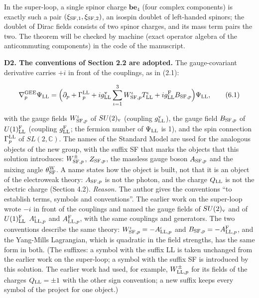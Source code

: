 \documentclass[
  10pt,
]{article}
\begin{document}
In the super-loop, a single spinor charge \(\mathbf b\mathbf e_4\) (four
complex components) is exactly such a pair
\((\xi_{{\rm SF},1},\xi_{{\rm SF},2})\), an isospin doublet of
left-handed spinors; the doublet of Dirac fields consists of two spinor
charges, and its mass term pairs the two. The theorem will be checked by
machine (exact operator algebra of the anticommuting components) in the
code of the manuscript.

\textbf{D2. The conventions of Section 2.2 are adopted.} The
gauge-covariant derivative carries \(+i\) in front of the couplings, as
in (2.1):

\[\nabla^{\rm GEE}_p\Psi_{\rm LL}=\Big(\partial_p+\Gamma^{\rm LL}_p+ig^{\rm v}_{\rm LL}\sum_{\iota=1}^3W^\iota_{{\rm SF},p}T^\iota_{\rm LL}+ig^{\rm F}_{\rm LL}B_{{\rm SF},p}\Big)\Psi_{\rm LL},\tag{6.1}\]

with the gauge fields \(W^\iota_{{\rm SF},p}\) of \(SU(2)_{\rm v}\)
(coupling \(g^{\rm v}_{\rm LL}\)), the gauge field \(B_{{\rm SF},p}\) of
\(U(1)^{\rm F}_{\rm LL}\) (coupling \(g^{\rm F}_{\rm LL}\); the fermion
number of \(\Psi_{\rm LL}\) is 1), and the spin connection
\(\Gamma^{\rm LL}_p\) of \(SL(2,\mathbb C)\). The names of the Standard
Model are used for the analogous objects of the new group, with the
suffix SF that marks the objects that this solution introduces:
\(W^\pm_{{\rm SF},p}\), \(Z_{{\rm SF},p}\), the massless gauge boson
\(A_{{\rm SF},p}\) and the mixing angle \(\theta^{\rm W}_{\rm SF}\). A
name states how the object is built, not that it is an object of the
electroweak theory: \(A_{{\rm SF},p}\) is not the photon, and the charge
\(Q_{\rm LL}\) is not the electric charge (Section 4.2). \emph{Reason.}
The author gives the conventions ``to establish terms, symbols and
conventions''. The earlier work on the super-loop wrote \(-i\) in front
of the couplings and named the gauge fields of \(SU(2)_{\rm v}\) and of
\(U(1)^{\rm F}_{\rm LL}\) \(A^\iota_{{\rm LL},p}\) and
\(A^{\rm F}_{{\rm LL},p}\), with the same couplings and generators. The
two conventions describe the same theory:
\(W^\iota_{{\rm SF},p}=-A^\iota_{{\rm LL},p}\) and
\(B_{{\rm SF},p}=-A^{\rm F}_{{\rm LL},p}\), and the Yang-Mills
Lagrangian, which is quadratic in the field strengths, has the same form
in both. (The suffixes: a symbol with the suffix LL is taken unchanged
from the earlier work on the super-loop; a symbol with the suffix SF is
introduced by this solution. The earlier work had used, for example,
\(W^\pm_{{\rm LL},p}\) for its fields of the charges \(Q_{\rm LL}=\pm1\)
with the other sign convention; a new suffix keeps every symbol of the
project for one object.)
\end{document}
